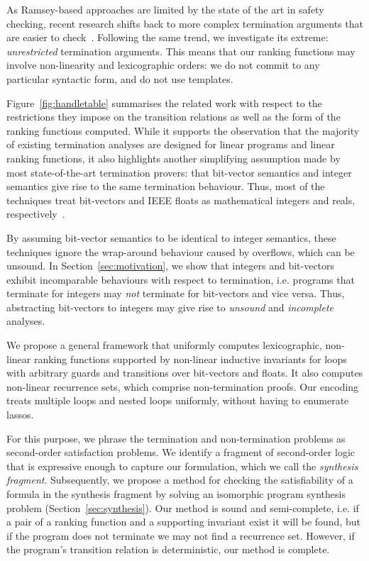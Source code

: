 \documentclass[preprint]{sigplanconf}
\theoremstyle{definition}
\begin{document}
As Ramsey-based approaches are limited by the state of the art in safety
checking, recent research shifts back to more complex termination arguments
that are easier to
check~\cite{DBLP:conf/cav/KroeningSTW10,DBLP:conf/tacas/CookSZ13}. 
Following the same trend, we investigate its extreme: \emph{unrestricted}
termination arguments.  This means that our ranking functions may involve
non-linearity and lexicographic orders: we do not commit to any particular
syntactic form, and do not use templates.

Figure~\ref{fig:handletable} summarises the related work with respect to the
restrictions they impose on the transition relations as well as the form of
the ranking functions computed.  While it supports the observation that the
majority of existing termination analyses are designed for linear programs
and linear ranking functions, it also highlights another simplifying
assumption made by most state-of-the-art termination provers: that
bit-vector semantics and integer semantics give rise to the same termination
behaviour.  Thus, most of the techniques treat bit-vectors and IEEE floats
as mathematical integers and reals,
respectively~\cite{DBLP:conf/pldi/CookPR06,DBLP:conf/popl/Ben-AmramG13,DBLP:conf/vmcai/P04,DBLP:conf/atva/HeizmannHLP13,DBLP:conf/vmcai/BradleyMS05,DBLP:conf/cav/KroeningSTW10}.

By assuming bit-vector semantics to be identical to integer semantics, these
techniques ignore the wrap-around behaviour caused by overflows, which can
be unsound.  In Section~\ref{sec:motivation}, we show that integers and
bit-vectors exhibit incomparable behaviours with respect to termination,
i.e.  programs that terminate for integers may \emph{not} terminate for
bit-vectors and vice versa.  Thus, abstracting bit-vectors to integers may
give rise to {\em unsound} and {\em incomplete} analyses.

We propose a general framework that uniformly computes lexicographic,
non-linear ranking functions supported by non-linear inductive invariants
for loops with arbitrary guards and transitions over bit-vectors and floats. 
It also computes non-linear recurrence sets, which comprise non-termination
proofs.  Our encoding treats multiple loops and nested loops uniformly,
without having to enumerate lassos.


 For this purpose, we phrase the termination and non-termination problems as
second-order satisfaction problems.  We identify a fragment of second-order
logic that is expressive enough to capture our formulation, which we call
the \emph{synthesis fragment}.  Subsequently, we propose a method for
checking the satisfiability of a formula in the synthesis fragment by
solving an isomorphic program synthesis problem
(Section~\ref{sec:synthesis}).  Our method is sound and semi-complete, i.e. 
if a pair of a ranking function and a supporting invariant exist it will be
found, but if the program does not terminate we may not find a recurrence
set.  However, if the program's transition relation is deterministic, our
method is complete.
\end{document}
